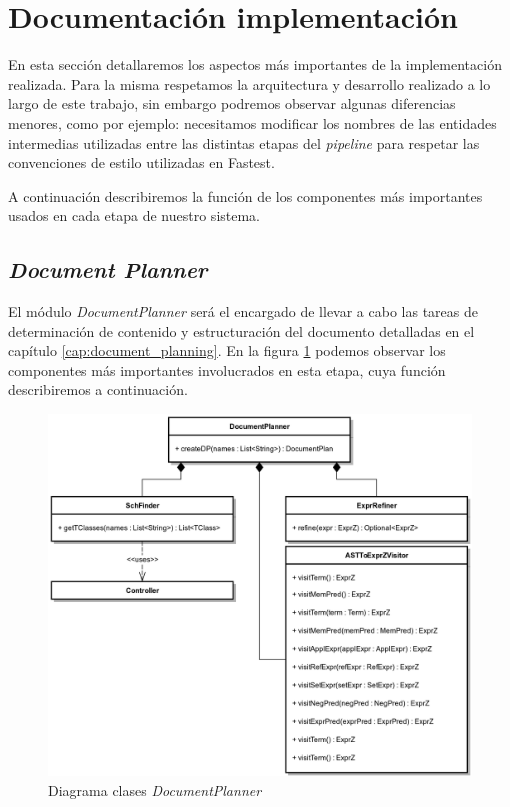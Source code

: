 \section{Documentación implementación}

En esta sección detallaremos los aspectos más importantes de la implementación realizada. Para la misma respetamos la arquitectura y desarrollo realizado a lo largo de este trabajo, sin embargo podremos observar algunas diferencias menores, como por ejemplo: necesitamos modificar los nombres de las entidades intermedias utilizadas entre las distintas etapas del \textit{pipeline} para respetar las convenciones de estilo utilizadas en Fastest.

A continuación describiremos la función de los componentes más importantes usados en cada etapa de nuestro sistema.

\subsection{\textit{Document Planner}}

El módulo \emph{DocumentPlanner} será el encargado de llevar a cabo las tareas de determinación de contenido y estructuración del documento detalladas en el capítulo \ref{cap:document_planning}. En la figura \ref{fig:imp_documentplanner} podemos observar los componentes más importantes involucrados en esta etapa, cuya función describiremos a continuación. 

\begin{figure}[H]
  	\centering
	\includegraphics[scale=0.25]{img/documentplanner_imp.png}
	\caption{Diagrama clases \textit{DocumentPlanner}}
  	\label{fig:imp_documentplanner}
\end{figure}

